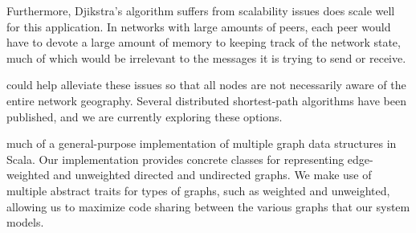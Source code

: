 \documentclass[a4paper,nobib]{tufte-handout}
\begin{document}
Furthermore, Djikstra's algorithm suffers from scalability issues does scale well for this application. In networks with large amounts of peers, each peer would have to devote a large amount of memory to keeping track of the network state, much of which would be irrelevant to the messages it is trying to send or receive.

 could help alleviate these issues so that all nodes are not necessarily aware of the entire network geography. Several distributed shortest-path algorithms have been published, and we are currently exploring these options.

 much of a general-purpose implementation of multiple graph data structures in Scala. Our implementation provides concrete classes for representing edge-weighted and unweighted directed and undirected graphs. We make use of multiple abstract traits for types of graphs, such as weighted and unweighted, allowing us to maximize code sharing between the various graphs that our system models.
\end{document}
